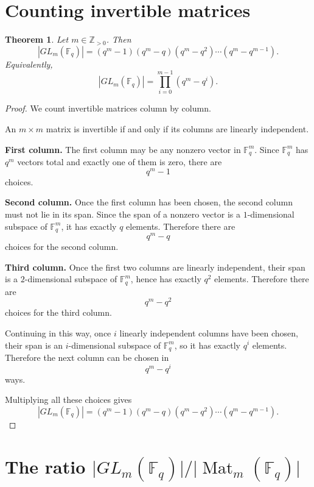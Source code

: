 \documentclass[11pt]{article}
\newcommand{\F}{\mathbb{F}}
\newcommand{\Mat}{\operatorname{Mat}}
\theoremstyle{definition}
\theoremstyle{plain}
\newtheorem{theorem}[definition]{Theorem}
\begin{document}
	\section{Counting invertible matrices}
	
	\begin{theorem}
		Let \(m\in \mathbb{Z}_{>0}\). Then
		\[
		|GL_m(\F_q)|=(q^m-1)(q^m-q)(q^m-q^2)\cdots(q^m-q^{m-1}).
		\]
		Equivalently,
		\[
		|GL_m(\F_q)|=\prod_{i=0}^{m-1}(q^m-q^i).
		\]
	\end{theorem}
	
	\begin{proof}
		We count invertible matrices column by column.
		
		An \(m\times m\) matrix is invertible if and only if its columns are linearly independent.
		
		\medskip
		
		\noindent\textbf{First column.}
		The first column may be any nonzero vector in \(\F_q^m\). Since \(\F_q^m\) has \(q^m\) vectors total and exactly one of them is zero, there are
		\[
		q^m-1
		\]
		choices.
		
		\medskip
		
		\noindent\textbf{Second column.}
		Once the first column has been chosen, the second column must not lie in its span. Since the span of a nonzero vector is a \(1\)-dimensional subspace of \(\F_q^m\), it has exactly \(q\) elements. Therefore there are
		\[
		q^m-q
		\]
		choices for the second column.
		
		\medskip
		
		\noindent\textbf{Third column.}
		Once the first two columns are linearly independent, their span is a \(2\)-dimensional subspace of \(\F_q^m\), hence has exactly \(q^2\) elements. Therefore there are
		\[
		q^m-q^2
		\]
		choices for the third column.
		
		\medskip
		
		Continuing in this way, once \(i\) linearly independent columns have been chosen, their span is an \(i\)-dimensional subspace of \(\F_q^m\), so it has exactly \(q^i\) elements. Therefore the next column can be chosen in
		\[
		q^m-q^i
		\]
		ways.
		
		Multiplying all these choices gives
		\[
		|GL_m(\F_q)|=(q^m-1)(q^m-q)(q^m-q^2)\cdots(q^m-q^{m-1}).
		\]
	\end{proof}
	
	\section{The ratio \(\lvert GL_m(\F_q)\rvert / \lvert \Mat_m(\F_q)\rvert\)}
	
\end{document}
